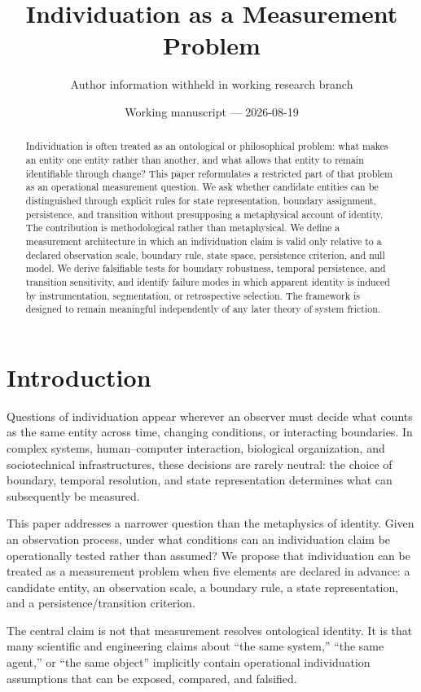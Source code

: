 \documentclass[11pt]{article}
\title{Individuation as a Measurement Problem}
\author{Author information withheld in working research branch}
\date{Working manuscript --- 2026-08-19}
\begin{document}
\maketitle

\begin{abstract}
Individuation is often treated as an ontological or philosophical problem: what makes an entity one entity rather than another, and what allows that entity to remain identifiable through change? This paper reformulates a restricted part of that problem as an operational measurement question. We ask whether candidate entities can be distinguished through explicit rules for state representation, boundary assignment, persistence, and transition without presupposing a metaphysical account of identity. The contribution is methodological rather than metaphysical. We define a measurement architecture in which an individuation claim is valid only relative to a declared observation scale, boundary rule, state space, persistence criterion, and null model. We derive falsifiable tests for boundary robustness, temporal persistence, and transition sensitivity, and identify failure modes in which apparent identity is induced by instrumentation, segmentation, or retrospective selection. The framework is designed to remain meaningful independently of any later theory of system friction.
\end{abstract}

\section{Introduction}
Questions of individuation appear wherever an observer must decide what counts as the same entity across time, changing conditions, or interacting boundaries. In complex systems, human--computer interaction, biological organization, and sociotechnical infrastructures, these decisions are rarely neutral: the choice of boundary, temporal resolution, and state representation determines what can subsequently be measured.

This paper addresses a narrower question than the metaphysics of identity. Given an observation process, under what conditions can an individuation claim be operationally tested rather than assumed? We propose that individuation can be treated as a measurement problem when five elements are declared in advance: a candidate entity, an observation scale, a boundary rule, a state representation, and a persistence/transition criterion.

The central claim is not that measurement resolves ontological identity. It is that many scientific and engineering claims about ``the same system,'' ``the same agent,'' or ``the same object'' implicitly contain operational individuation assumptions that can be exposed, compared, and falsified.
\end{document}
